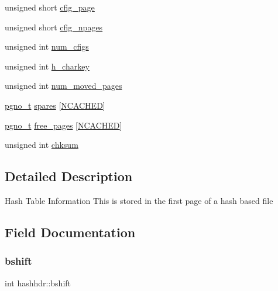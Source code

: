 \begin{DoxyCompactItemize}
\item 
unsigned short \mbox{\hyperlink{structhashhdr_a1ae40392d2750ee0cace86c6489b46f4}{cfig\+\_\+page}}
\item 
unsigned short \mbox{\hyperlink{structhashhdr_aec73ec8707c3938d6999f05984130476}{cfig\+\_\+npages}}
\item 
unsigned int \mbox{\hyperlink{structhashhdr_a05c33143f9e8aada42858930fb8058f0}{num\+\_\+cfigs}}
\item 
unsigned int \mbox{\hyperlink{structhashhdr_a5af866b3ffa5d9130692987e0d1d6439}{h\+\_\+charkey}}
\item 
unsigned int \mbox{\hyperlink{structhashhdr_ac50a7cbc7fe8275da82199536384d71d}{num\+\_\+moved\+\_\+pages}}
\item 
\mbox{\hyperlink{adat-devel_2other__libs_2filedb_2filehash_2ffdb__db_8h_a000813331643d38481142bcce7de1501}{pgno\+\_\+t}} \mbox{\hyperlink{structhashhdr_ab4d7d141fc9782081968fb6700c30d27}{spares}} \mbox{[}\mbox{\hyperlink{adat__devel_2other__libs_2filedb_2filehash_2ffdb__hash_8h_a2a0096aff8f4e93a03a33f31917b4067}{N\+C\+A\+C\+H\+ED}}\mbox{]}
\item 
\mbox{\hyperlink{adat-devel_2other__libs_2filedb_2filehash_2ffdb__db_8h_a000813331643d38481142bcce7de1501}{pgno\+\_\+t}} \mbox{\hyperlink{structhashhdr_a02980483dec11d8a93c4ae093c18d966}{free\+\_\+pages}} \mbox{[}\mbox{\hyperlink{adat__devel_2other__libs_2filedb_2filehash_2ffdb__hash_8h_a2a0096aff8f4e93a03a33f31917b4067}{N\+C\+A\+C\+H\+ED}}\mbox{]}
\item 
unsigned int \mbox{\hyperlink{structhashhdr_aeaff041fc98272420df85480992eee08}{chksum}}
\end{DoxyCompactItemize}


\subsection{Detailed Description}
Hash Table Information This is stored in the first page of a hash based file 

\subsection{Field Documentation}
\mbox{\label{structhashhdr_a0f659452a041702880751164a032c46b}} 
\subsubsection{\texorpdfstring{bshift}{bshift}}
{\footnotesize\ttfamily int hashhdr\+::bshift}

